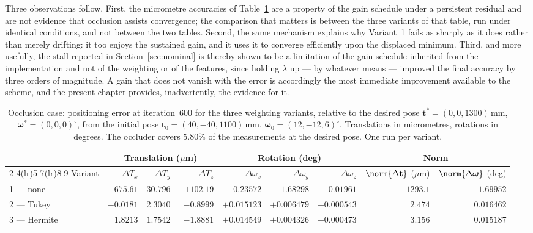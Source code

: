 Three observations follow. First, the micrometre accuracies of
Table~\ref{tab:Occlusion_pose} are a property of the gain schedule under a
persistent residual and are not evidence that occlusion assists convergence;
the comparison that matters is between the three variants of that table, run
under identical conditions, and not between the two tables. Second, the same
mechanism explains why Variant~1 fails as sharply as it does rather than
merely drifting: it too enjoys the sustained gain, and it uses it to converge
efficiently upon the displaced minimum. Third, and more usefully, the stall
reported in Section~\ref{sec:nominal} is thereby shown to be a limitation of
the gain schedule inherited from the implementation and not of the weighting
or of the features, since holding $\lambda$ up --- by whatever means ---
improved the final accuracy by three orders of magnitude. A gain that does not
vanish with the error is accordingly the most immediate improvement available
to the scheme, and the present chapter provides, inadvertently, the evidence
for it.

\begin{table}[H]
    \centering
    \caption{Occlusion case: positioning error at iteration~600 for the three
    weighting variants, relative to the desired pose
    $\mathbf{t}^{*}=(0,0,1300)\,\mathrm{mm}$,
    $\boldsymbol{\omega}^{*}=(0,0,0)^{\circ}$, from the initial pose
    $\mathbf{t}_{0}=(40,-40,1100)\,\mathrm{mm}$,
    $\boldsymbol{\omega}_{0}=(12,-12,6)^{\circ}$. Translations in
    micrometres, rotations in degrees. The occluder covers $5.80\%$ of the
    measurements at the desired pose. One run per variant.}
  \label{tab:Occlusion_pose}
    \small
    \begin{tabular}{@{}lrrrrrrrr@{}}
        \toprule
        & \multicolumn{3}{c}{Translation ($\mu$m)}
        & \multicolumn{3}{c}{Rotation (deg)}
        & \multicolumn{2}{c}{Norm} \\
        \cmidrule(lr){2-4}\cmidrule(lr){5-7}\cmidrule(lr){8-9}
        Variant & $\Delta T_x$ & $\Delta T_y$ & $\Delta T_z$
                & $\Delta\omega_x$ & $\Delta\omega_y$ & $\Delta\omega_z$
                & $\norm{\Delta\mathbf{t}}$ ($\mu$m)
                & $\norm{\Delta\boldsymbol{\omega}}$ (deg) \\
        \midrule
        1 --- none    & $675.61$  & $30.796$ & $-1102.19$ & $-0.23572$  & $-1.68298$  & $-0.01961$  & $1293.1$ & $1.69952$ \\
        2 --- Tukey   & $-0.0181$ & $2.3040$ & $-0.8999$  & $+0.015123$ & $+0.006479$ & $-0.000543$ & $2.474$  & $0.016462$ \\
        3 --- Hermite & $1.8213$  & $1.7542$ & $-1.8881$  & $+0.014549$ & $+0.004326$ & $-0.000473$ & $3.156$  & $0.015187$ \\
        \bottomrule
    \end{tabular}
\end{table}

